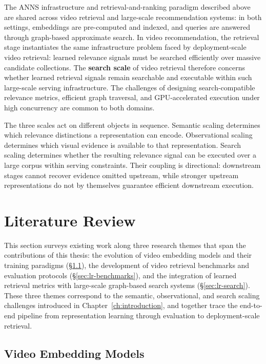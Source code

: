 The ANNS infrastructure and retrieval-and-ranking paradigm described above are shared across video retrieval and large-scale recommendation systems: in both settings, embeddings are pre-computed and indexed, and queries are answered through graph-based approximate search. In video recommendation, the retrieval stage instantiates the same infrastructure problem faced by deployment-scale video retrieval: learned relevance signals must be searched efficiently over massive candidate collections. The \textbf{search scale} of video retrieval therefore concerns whether learned retrieval signals remain searchable and executable within such large-scale serving infrastructure. The challenges of designing search-compatible relevance metrics, efficient graph traversal, and GPU-accelerated execution under high concurrency are common to both domains.

The three scales act on different objects in sequence. Semantic scaling determines which relevance distinctions a representation can encode. Observational scaling determines which visual evidence is available to that representation. Search scaling determines whether the resulting relevance signal can be executed over a large corpus within serving constraints. Their coupling is directional: downstream stages cannot recover evidence omitted upstream, while stronger upstream representations do not by themselves guarantee efficient downstream execution.

\section{Literature Review}
\label{sec:rw-literature}

This section surveys existing work along three research themes that span the contributions of this thesis: the evolution of video embedding models and their training paradigms (\S\ref{sec:lr-embedding}), the development of video retrieval benchmarks and evaluation protocols (\S\ref{sec:lr-benchmarks}), and the integration of learned retrieval metrics with large-scale graph-based search systems (\S\ref{sec:lr-search}). These three themes correspond to the semantic, observational, and search scaling challenges introduced in Chapter~\ref{ch:introduction}, and together trace the end-to-end pipeline from representation learning through evaluation to deployment-scale retrieval.

\subsection{Video Embedding Models}
\label{sec:lr-embedding}

